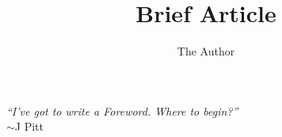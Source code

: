 \documentclass[fleqn, hidelinks]{article} %
\title{Brief Article}
\author{The Author}
\begin{document}

\setcounter{page}{2}

\newpage{}
\thispagestyle{empty}

\vspace*{100pt}
\begin{flushright}
	\textit{``I've got to write a Foreword. Where to begin?''}
    \\$\sim$J Pitt 
\end{flushright}

\newpage{}


\tableofcontents




















\end{document}
